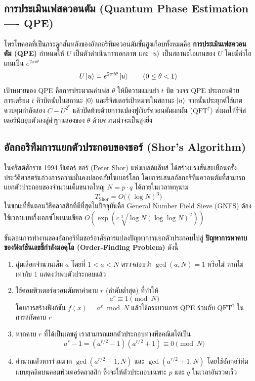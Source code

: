 \subsection{การประเมินเฟสควอนตัม (Quantum Phase Estimation ---- QPE)}
โพรโทคอลที่เป็นกระดูกสันหลังของอัลกอริทึมควอนตัมขั้นสูงเกือบทั้งหมดคือ \textbf{การประเมินเฟสควอนตัม (QPE)} กำหนดให้ $U$ เป็นตัวดำเนินการเอกภาพ และ $\ket{u}$ เป็นสถานะไอเกนของ $U$ โดยมีค่าไอเกนเป็น $e^{2\pi i \theta}$
\begin{equation}
U \ket{u} = e^{2\pi i \theta} \ket{u} \qquad (0 \le \theta < 1)
\end{equation}
เป้าหมายของ QPE คือการประมาณค่าเฟส $\theta$ ให้มีความแม่นยำ $t$ บิต วงจร QPE ประกอบด้วยการเตรียม $t$ คิวบิตนับในสถานะ $\ket{0}$ และรีจิสเตอร์เป้าหมายในสถานะ $\ket{u}$ จากนั้นประยุกต์ใช้เกตควบคุมกำลังสอง $C-U^{2^k}$ แล้วปิดท้ายด้วยการแปลงฟูเรียร์ควอนตัมผกผัน ($\text{QFT}^\dagger$) ส่งผลให้รีจิสเตอร์นับยุบตัวลงสู่ค่าฐานสองของ $\theta$ ด้วยความน่าจะเป็นสูงยิ่ง

\subsection{อัลกอริทึมการแยกตัวประกอบของชอร์ (Shor's Algorithm)}
ในคริสต์ศักราช 1994 ปีเตอร์ ชอร์ (Peter Shor) แห่งเบลล์แล็บส์ ได้สร้างแรงสั่นสะเทือนครั้งประวัติศาสตร์แก่วงการความมั่นคงปลอดภัยไซเบอร์โลก โดยการเสนออัลกอริทึมควอนตัมที่สามารถแยกตัวประกอบของจำนวนเต็มขนาดใหญ่ $N = p \cdot q$ ได้ภายในเวลาพหุนาม
\begin{equation}
T_{\text{Shor}} = O\big( (\log N)^3 \big)
\label{eq:shor_time_complexity}
\end{equation}
ในขณะที่ขั้นตอนวิธีคลาสสิกที่ดีที่สุดในปัจจุบันคือ General Number Field Sieve (GNFS) ต้องใช้เวลาแบบกึ่งเอกซ์โพเนนเชียล $O\left(\exp\left(c \sqrt[3]{\log N (\log \log N)^2}\right)\right)$

ขั้นตอนการทำงานของอัลกอริทึมชอร์อาศัยการแปลงปัญหาการแยกตัวประกอบไปสู่ \textbf{ปัญหาการหาคาบของฟังก์ชันเลขชี้กำลังมอดุโล (Order-Finding Problem)} ดังนี้
\begin{enumerate}
    \item สุ่มเลือกจำนวนเต็ม $a$ โดยที่ $1 < a < N$ ตรวจสอบว่า $\gcd(a, N) = 1$ หรือไม่ หากไม่เท่ากับ 1 แสดงว่าพบตัวประกอบแล้ว
    \item ใช้คอมพิวเตอร์ควอนตัมหาค่าคาบ $r$ (ลำดับต่ำสุด) ที่ทำให้
    \begin{equation}
    a^r \equiv 1 \pmod N
    \label{eq:order_finding_modular}
    \end{equation}
    โดยการสร้างฟังก์ชัน $f(x) = a^x \bmod N$ แล้วใช้กระบวนการ QPE ร่วมกับ $\text{QFT}^\dagger$ ในการสกัดคาบ $r$
    \item หากคาบ $r$ ที่ได้เป็นเลขคู่ เราสามารถแยกตัวประกอบทางพีชคณิตได้เป็น
    \begin{equation}
    a^r - 1 = (a^{r/2} - 1)(a^{r/2} + 1) \equiv 0 \pmod N
    \end{equation}
    \item คำนวณตัวหารร่วมมาก $\gcd(a^{r/2} - 1, N)$ และ $\gcd(a^{r/2} + 1, N)$ โดยใช้อัลกอริทึมแบบยุคลิดบนคอมพิวเตอร์คลาสสิก ซึ่งจะให้ตัวประกอบเฉพาะ $p$ และ $q$ ในเวลาอันรวดเร็ว
\end{enumerate}


